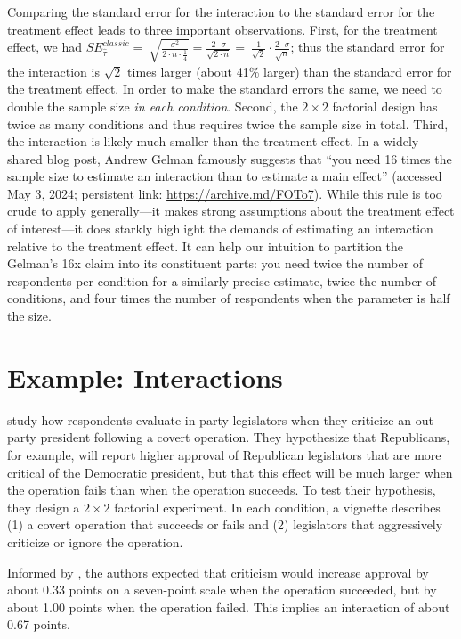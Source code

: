 \documentclass[12pt]{article}
\begin{document}
Comparing the standard error for the interaction to the standard error for the treatment effect leads to three important observations. First, for the treatment effect, we had $SE_{\widehat{\tau}}^{classic} = \ \sqrt{\frac{\sigma^{2}}{2 \cdot n \cdot \frac{1}{4}}} = \frac{2 \cdot \sigma}{\sqrt{2 \cdot n}} = \ \frac{1}{\sqrt{2}} \cdot \frac{2 \cdot \sigma}{\sqrt{n}}$; thus the standard error for the interaction is $\sqrt{2}$ times larger (about 41\% larger) than the standard error for the treatment effect. In order to make the standard errors the same, we need to double the sample size \textit{in each condition}.
Second, the $2 \times 2$ factorial design has twice as many conditions and thus requires twice the sample size in total. 
Third, the interaction is likely much smaller than the treatment effect. 
In a widely shared blog post, Andrew Gelman famously suggests that ``you
need 16 times the sample size to estimate an interaction than to
estimate a main effect'' (accessed May 3, 2024; persistent link:
\url{https://archive.md/FOTo7}). 
While this rule is too crude to apply generally---it makes strong assumptions about the treatment effect of interest---it does starkly highlight the demands of estimating an interaction relative to the treatment effect. 
It can help our intuition to partition the Gelman's 16x claim into its constituent parts: you need twice the number of respondents per condition for a similarly precise estimate, twice the number of conditions, and four times the number of respondents when the parameter is half the size.

\section*{Example: Interactions}

\cite{Robbins2024} study how respondents evaluate in-party legislators when they criticize an out-party president following a covert operation. 
They hypothesize that Republicans, for example, will report higher approval of Republican legislators that are more critical of the Democratic president, but that this effect will be much larger when the operation fails than when the operation succeeds. 
To test their hypothesis, they design a $2 \times 2$ factorial experiment. 
In each condition, a vignette describes (1) a covert operation that succeeds or fails and (2) legislators that aggressively criticize or ignore the operation.

Informed by \cite{Myrick2020}, the authors expected that criticism would increase approval by about 0.33 points on a seven-point scale when the operation succeeded, but by about 1.00 points when the operation failed.
This implies an interaction of about 0.67 points.
\end{document}
